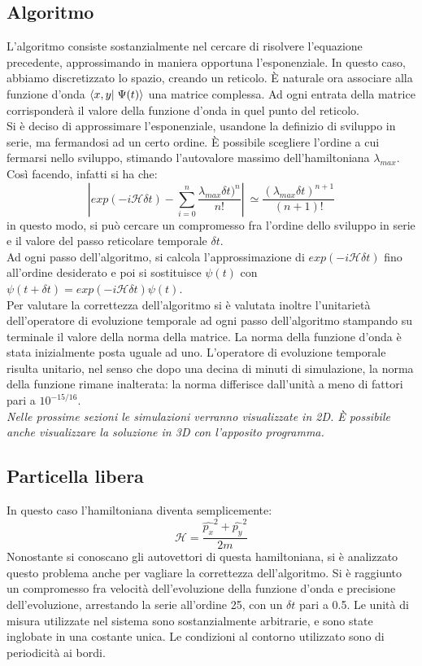 \subsection{Algoritmo}
L'algoritmo consiste sostanzialmente nel cercare di risolvere l'equazione precedente, approssimando in maniera opportuna l'esponenziale.
In questo caso, abbiamo discretizzato lo spazio, creando un reticolo. È naturale ora associare alla funzione d'onda $ \braket{x,y}{\Psi(t)}$ una
matrice complessa. Ad ogni entrata della matrice corrisponderà il valore della funzione d'onda in quel punto del reticolo.\\
Si è deciso di approssimare l'esponenziale, usandone la definizio di sviluppo in serie, ma fermandosi ad un certo ordine. È possibile scegliere l'ordine a cui fermarsi nello sviluppo,
stimando l'autovalore massimo dell'hamiltoniana $ \lambda_{max}$. Così facendo, infatti si ha che:
$$
\left| exp \left( - i \mathcal{H} \delta t \right) - \sum_{i=0}^n \frac{\lambda_{max} \delta t)^{n}}{n!} \right| \ \simeq \frac{\left(\lambda_{max} \delta t\right)^{n+1}}{(n+1)!} 
$$
in questo modo, si può cercare un compromesso fra l'ordine dello sviluppo in serie e il valore del passo reticolare temporale $\delta t$.\\
Ad ogni passo dell'algoritmo, si calcola l'approssimazione di $ exp \left( -i \mathcal{H} \delta t \right)$ fino all'ordine desiderato e poi si
sostituisce $ \psi(t)$ con $\psi(t+\delta t) = exp \left( -i \mathcal{H} \delta t \right) \psi(t)$.\\
Per valutare la correttezza dell'algoritmo si è valutata inoltre l'unitarietà dell'operatore di evoluzione temporale ad ogni passo dell'algoritmo stampando su terminale il valore della norma
della matrice. La norma della funzione d'onda è stata inizialmente posta uguale ad uno. L'operatore di evoluzione temporale risulta unitario, nel senso che dopo una decina di minuti di simulazione,
la norma della funzione rimane inalterata: la norma differisce dall'unità a meno di fattori pari a $10^{-15/16}$.\\

\emph{Nelle prossime sezioni le simulazioni verranno visualizzate in 2D. È possibile anche visualizzare la soluzione in 3D con l'apposito programma.}
\subsection{Particella libera}
In questo caso l'hamiltoniana diventa semplicemente:
$$
\mathcal{H} = \frac{\hat{p_x}^2+\hat{p_y}^2}{2m}
$$
Nonostante si conoscano gli autovettori di questa hamiltoniana, si è analizzato questo problema anche per vagliare la correttezza dell'algoritmo.
Si è raggiunto un compromesso fra velocità dell'evoluzione della funzione d'onda e precisione dell'evoluzione, arrestando la serie all'ordine 25, con un $\delta t$ pari a 0.5.
Le unità di misura utilizzate nel sistema sono sostanzialmente arbitrarie, e sono state inglobate in una costante unica.
Le condizioni al contorno utilizzato sono di periodicità ai bordi.\\

